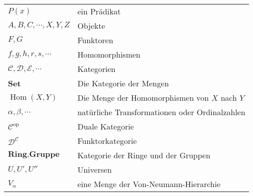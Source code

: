 \documentclass[a4paper]{amsart}
\theoremstyle{definition}
\DeclareMathOperator{\Hom}{Hom}
\newcommand{\CC}{\ensuremath{\mathcal{ C }}}
\newcommand{\DD}{\ensuremath{\mathcal{ D }}}
\begin{document}
\begin{tabular}{ll}
    $P(x)$                              & ein Prädikat\\
    $A, B, C, \cdots, X, Y, Z$          & Objekte\\
    $F,G$                               & Funktoren\\
    $f, g, h, r, s, \cdots$             & Homomorphismen\\
    $\mathcal C, \mathcal D, \mathcal E, \cdots$ & Kategorien\\
    \textbf{Set}                        & Die Kategorie der Mengen\\
    $\Hom( X, Y)$                       & Die Menge der Homomorphismen von $X$ nach $Y$\\
    $\alpha, \beta, \cdots$             & natürliche Transformationen oder Ordinalzahlen\\
    $\mathcal C ^{\text{op}}$           & Duale Kategorie\\
    $\DD^\CC$                           & Funktorkategorie\\
    $\textbf{Ring}, \textbf{Gruppe}$    & Kategorie der Ringe und der Gruppen\\
    $U, U', U''$                        & Universen\\
    $V_\alpha$                          & eine Menge der Von-Neumann-Hierarchie

\end{tabular}
\end{document}
